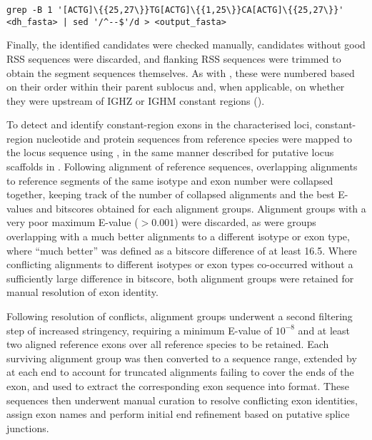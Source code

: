 \begin{lstlisting}
grep -B 1 '[ACTG]\{{25,27\}}TG[ACTG]\{{1,25\}}CA[ACTG]\{{25,27\}}' <dh_fasta> | sed '/^--$'/d > <output_fasta>
\end{lstlisting}

Finally, the identified \dh candidates were checked manually, candidates without good RSS sequences were discarded, and flanking RSS sequences were trimmed to obtain the \dh segment sequences themselves. As with \jh, these were numbered based on their order within their parent sublocus and, when applicable, on whether they were upstream of IGHZ or IGHM constant regions ().


\noindent To detect and identify constant-region exons in the characterised loci, constant-region nucleotide and protein sequences from reference species were mapped to the locus sequence using  \parencite{altschul1990blast,altschul1997blast}, in the same manner described for putative locus scaffolds in .
Following alignment of reference sequences, overlapping alignments to reference segments of the same isotype and exon number were collapsed together, keeping track of the number of collapsed alignments and the best E-values and bitscores obtained for each alignment groups. Alignment groups with a very poor maximum E-value ($> 0.001$) were discarded, as were groups overlapping with a much better alignments to a different isotype or exon type, where ``much better'' was defined as a bitscore difference of at least 16.5. Where conflicting alignments to different isotypes or exon types co-occurred without a sufficiently large difference in bitscore, both alignment groups were retained for manual resolution of exon identity.


Following resolution of conflicts, alignment groups underwent a second filtering step of increased stringency, requiring a minimum E-value of $10^{-8}$ and at least two aligned reference exons over all reference species to be retained. Each surviving alignment group was then converted to a sequence range, extended by  at each end to account for truncated alignments failing to cover the ends of the exon, and used to extract the corresponding exon sequence into  format. These sequences then underwent manual curation to resolve conflicting exon identities, assign exon names and perform initial end refinement based on putative splice junctions.


